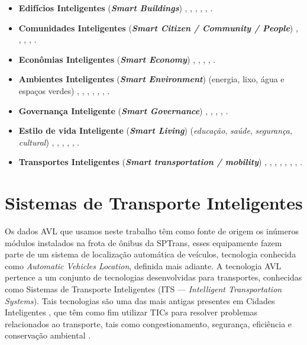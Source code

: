 \documentclass[
	12pt,				%
	oneside,			%
	a4paper,			%
	english,			%
	brazil				%
	]{abntex2ppgsi}
\begin{document}
{\begin{itemize}
\item \textbf{Edifícios Inteligentes} (\textit{\textbf{Smart Buildings}}) \cite{Talari2017}, \cite{Moreno2017}, \cite{Ang2017}, \cite{Finger2017}, \cite{Santos2017}, \cite{Kummitha2017}.
\item \textbf{Comunidades Inteligentes} (\textit{\textit{\textbf{Smart Citizen / Community / People}}}) \cite{Talari2017}, \cite{Santos2017}, \cite{Kummitha2017}, \cite{Barth2017}, \cite{Ahvenniemi2017}.
\item \textbf{Econômias Inteligentes} (\textit{\textbf{Smart Economy}}) \cite{Santos2017}, \cite{Kummitha2017}, \cite{Barth2017}, \cite{Xiao2017}, \cite{Ahvenniemi2017}.
\item \textbf{Ambientes Inteligentes} (\textit{\textbf{Smart Environment}}) (energia, lixo, água e espaços verdes) \cite{Santos2017}, \cite{Finger2017}, \cite{Talari2017}, \cite{Ang2017}, \cite{Kummitha2017}, \cite{Barth2017}, \cite{Ahvenniemi2017}.
\item \textbf{Governança Inteligente} (\textit{\textbf{Smart Governance}}) \cite{Talari2017}, \cite{Santos2017}, \cite{Kummitha2017}, \cite{Barth2017}, \cite{Ahvenniemi2017}.
\item \textbf{Estilo de vida Inteligente} (\textit{\textbf{Smart Living}}) (\textit{educação}, \textit{saúde}, \textit{segurança}, \textit{cultural}) \cite{Santos2017}, \cite{Talari2017}, \cite{Kummitha2017}, \cite{Barth2017}, \cite{Xiao2017}, \cite{Ahvenniemi2017}.
\item \textbf{Transportes Inteligentes} (\textit{\textbf{Smart transportation / mobility}}) \cite{Talari2017}, \cite{Moreno2017}, \cite{Ang2017}, \cite{Finger2017}, \cite{Santos2017}, \cite{Kummitha2017}, \cite{Barth2017}, \cite{Ahvenniemi2017}.
\end{itemize}

\section{Sistemas de Transporte Inteligentes}
\label{its}

Os dados AVL que usamos neste trabalho têm como fonte de origem os inúmeros módulos instalados na frota de ônibus da SPTrans, esses equipamente fazem parte de um sistema de localização automática de veículos, tecnologia conhecida como \textit{Automatic Vehicles Location}, definida mais adiante. A tecnologia AVL pertence a um conjunto de tecnologias desenvolvidas para transportes, conhecidas como Sistemas de Transporte Inteligentes (ITS --- \textit{Intelligent Transportation Systems}). Tais tecnologias são uma das mais antigas presentes em Cidades Inteligentes \cite{menouar2017uav}, que têm como fim utilizar TICs para resolver problemas relacionados ao transporte, tais como congestionamento, segurança, eficiência e conservação ambiental \cite{figueiredo2001towards}. 

}
\end{document}
